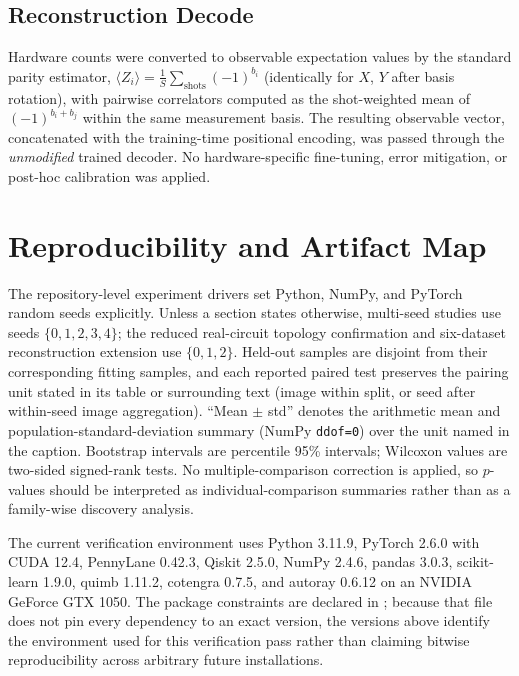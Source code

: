\documentclass[11pt]{article}
\begin{document}
\subsection{Reconstruction Decode}
Hardware counts were converted to observable expectation values by the standard parity estimator, $\langle Z_i\rangle = \frac{1}{S}\sum_{\text{shots}} (-1)^{b_i}$ (identically for $X$, $Y$ after basis rotation), with pairwise correlators computed as the shot-weighted mean of $(-1)^{b_i+b_j}$ within the same measurement basis. The resulting observable vector, concatenated with the training-time positional encoding, was passed through the \emph{unmodified} trained decoder. No hardware-specific fine-tuning, error mitigation, or post-hoc calibration was applied.

\section{Reproducibility and Artifact Map}\leavevmode\par
The repository-level experiment drivers set Python, NumPy, and PyTorch random seeds explicitly. Unless a section states otherwise, multi-seed studies use seeds $\{0,1,2,3,4\}$; the reduced real-circuit topology confirmation and six-dataset reconstruction extension use $\{0,1,2\}$. Held-out samples are disjoint from their corresponding fitting samples, and each reported paired test preserves the pairing unit stated in its table or surrounding text (image within split, or seed after within-seed image aggregation). ``Mean $\pm$ std'' denotes the arithmetic mean and population-standard-deviation summary (NumPy \texttt{ddof=0}) over the unit named in the caption. Bootstrap intervals are percentile 95\% intervals; Wilcoxon values are two-sided signed-rank tests. No multiple-comparison correction is applied, so $p$-values should be interpreted as individual-comparison summaries rather than as a family-wise discovery analysis.

The current verification environment uses Python 3.11.9, PyTorch 2.6.0 with CUDA 12.4, PennyLane 0.42.3, Qiskit 2.5.0, NumPy 2.4.6, pandas 3.0.3, scikit-learn 1.9.0, quimb 1.11.2, cotengra 0.7.5, and autoray 0.6.12 on an NVIDIA GeForce GTX 1050. The package constraints are declared in ; because that file does not pin every dependency to an exact version, the versions above identify the environment used for this verification pass rather than claiming bitwise reproducibility across arbitrary future installations.
\end{document}
